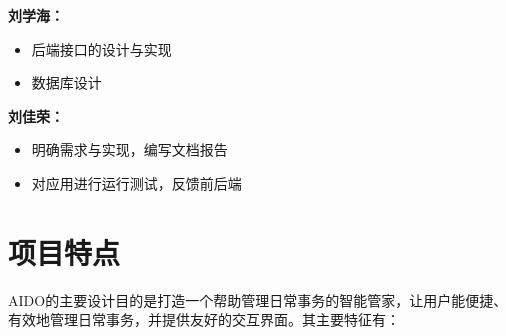\documentclass[logo,reportComp]{thesis}
\begin{document}
\textbf{刘学海：}
\begin{itemize}
\item 后端接口的设计与实现
\item 数据库设计
\end{itemize}

\textbf{刘佳荣：}
\begin{itemize}
\item 明确需求与实现，编写文档报告
\item 对应用进行运行测试，反馈前后端
\end{itemize}

\section{项目特点}

AIDO的主要设计目的是打造一个帮助管理日常事务的智能管家，让用户能便捷、有效地管理日常事务，并提供友好的交互界面。其主要特征有：
\end{document}
